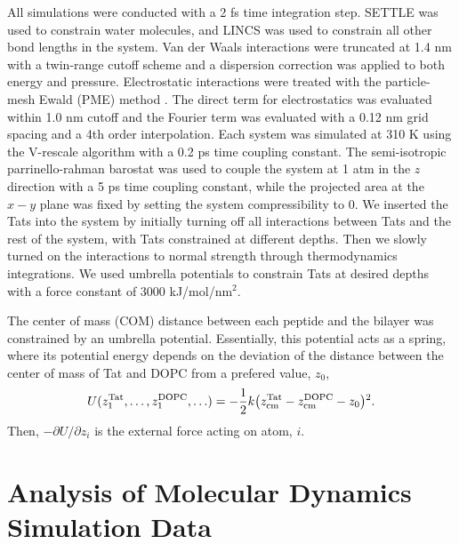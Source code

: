 All simulations were conducted with a 2 fs time integration step. 
SETTLE \cite{Miyamoto92} was used
to constrain water molecules, and LINCS \cite{Hess97} was used to constrain all other bond lengths in the
system. 
Van der Waals interactions were truncated at 1.4 nm with a twin-range cutoff scheme and a
dispersion correction was applied to both energy and pressure. Electrostatic interactions were
treated with the particle-mesh Ewald (PME) method \cite{Darden93}. The direct term for electrostatics was
evaluated within 1.0 nm cutoff and the Fourier term was evaluated with a 0.12 nm grid spacing
and a 4th order interpolation. Each system was simulated at 310 K using the V-rescale
algorithm \cite{Bussi07} with a 0.2 ps time coupling constant. The semi-isotropic parrinello-rahman barostat
\cite{Parrinello81} was used to couple the system at 1 atm in the $z$ direction with a 5 ps time coupling constant,
while the projected area at the $x-y$ plane was fixed by setting the system compressibility to 0.
We inserted the Tats into the system by initially turning off all interactions between Tats and the
rest of the system, with Tats constrained at different depths. Then we slowly turned on the
interactions to normal strength through thermodynamics integrations. We used umbrella
potentials to constrain Tats at desired depths with a force constant of 3000 kJ/mol/nm$^2$.

The center of mass (COM) distance between each peptide and the bilayer was 
constrained by an umbrella potential. 
Essentially, this potential acts as a spring, 
where its potential energy depends on the deviation of the distance 
between the center of mass of Tat and DOPC from a prefered value, $z_0$,
\begin{equation*}
  U(z_1^{\textrm{Tat}},\ldots,z_1^{\textrm{DOPC}},\ldots) = 
  -\frac{1}{2} k 
  \mathopen{}\left( z_{\textrm{cm}}^{\textrm{Tat}} - z_{\textrm{cm}}^{\textrm{DOPC}} - z_0 \right)\mathclose{}^2.
\end{equation*}
Then, $-\partial U/\partial z_i$ is the external force acting 
on atom, $i$. 

\section{Analysis of Molecular Dynamics Simulation Data}
